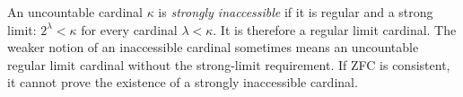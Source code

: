 
An uncountable cardinal $\kappa$ is \emph{strongly inaccessible} if it is regular and a strong limit: $2^\lambda<\kappa$ for every cardinal $\lambda<\kappa$. It is therefore a regular limit cardinal. The weaker notion of an inaccessible cardinal sometimes means an uncountable regular limit cardinal without the strong-limit requirement. If ZFC is consistent, it cannot prove the existence of a strongly inaccessible cardinal.
